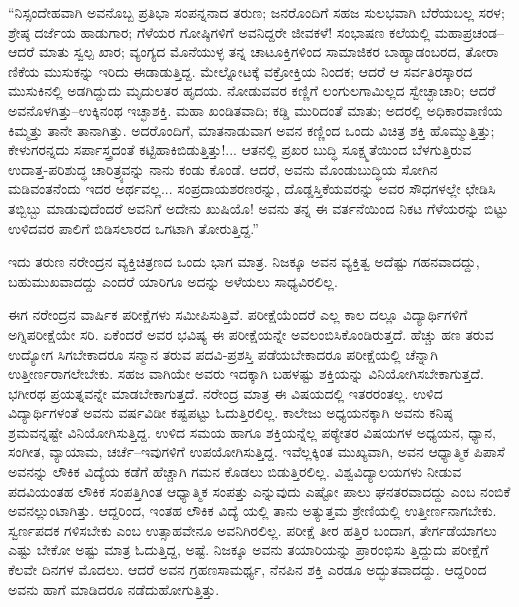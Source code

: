 “ನಿಸ್ಸಂದೇಹವಾಗಿ ಅವನೊಬ್ಬ ಪ್ರತಿಭಾ ಸಂಪನ್ನನಾದ ತರುಣ; ಜನರೊಂದಿಗೆ ಸಹಜ ಸುಲಭವಾಗಿ ಬೆರೆಯಬಲ್ಲ ಸರಳ; ಶ್ರೇಷ್ಠ ದರ್ಜೆಯ ಹಾಡುಗಾರ; ಗೆಳೆಯರ ಗೋಷ್ಠಿಗಳಿಗೆ ಅವನಿದ್ದರೇ ಜೀವಕಳೆ! ಸಂಭಾಷಣ ಕಲೆಯಲ್ಲಿ ಮಹಾಪ್ರಚಂಡ–ಆದರೆ ಮಾತು ಸ್ವಲ್ಪ ಖಾರ; ವ್ಯಂಗ್ಯದ ಮೊನೆಯುಳ್ಳ ತನ್ನ ಚಾಟೂಕ್ತಿಗಳಿಂದ ಸಾಮಾಜಿಕರ ಬಾಹ್ಯಾಡಂಬರದ, ತೋರಾ ಣಿಕೆಯ ಮುಸುಕನ್ನು ಇರಿದು ಈಡಾಡುತ್ತಿದ್ದ. ಮೇಲ್ನೋಟಕ್ಕೆ ವಕ್ರೋಕ್ತಿಯ ನಿಂದಕ; ಆದರೆ ಆ ಸರ್ವತಿರಸ್ಕಾರದ ಮುಸುಕಿನಲ್ಲಿ ಅಡಗಿದ್ದುದು ಮೃದುಲತರ ಹೃದಯ. ನೋಡುವವರ ಕಣ್ಣಿಗೆ ಲಂಗುಲಗಾಮಿಲ್ಲದ ಸ್ವೇಚ್ಛಾಚಾರಿ; ಆದರೆ ಅವನೊಳಗಿತ್ತು–ಉಕ್ಕಿನಂಥ ಇಚ್ಛಾಶಕ್ತಿ. ಮಹಾ ಖಂಡಿತವಾದಿ; ಕಡ್ಡಿ ಮುರಿದಂತೆ ಮಾತು; ಅದರಲ್ಲಿ ಅಧಿಕಾರವಾಣಿಯ ಕಿಮ್ಮತ್ತು ತಾನೇ ತಾನಾಗಿತ್ತು. ಅದರೊಂದಿಗೆ, ಮಾತನಾಡುವಾಗ ಅವನ ಕಣ್ಣಿಂದ ಒಂದು ವಿಚಿತ್ರ ಶಕ್ತಿ ಹೊಮ್ಮುತ್ತಿತ್ತು; ಕೇಳುಗರನ್ನದು ಸರ್ಪಾಸ್ತ್ರದಂತೆ ಕಟ್ಟಿಹಾಕಿಬಿಡುತ್ತಿತ್ತು!... ಆತನಲ್ಲಿ ಪ್ರಖರ ಬುದ್ಧಿ ಸೂಕ್ಷ್ಮತೆಯಿಂದ ಬೆಳಗುತ್ತಿರುವ ಉದಾತ್ತ-ಪರಿಶುದ್ಧ ಚಾರಿತ್ರ್ಯವನ್ನು ನಾನು ಕಂಡು ಕೊಂಡೆ. ಆದರೆ, ಅವನು ಮೊಂಡುಬುದ್ಧಿಯ ಸೋಗಿನ ಮಡಿವಂತನೆಂದು ಇದರ ಅರ್ಥವಲ್ಲ... ಸಂಪ್ರದಾಯಶರಣರನ್ನು, ದೊಡ್ಡಸ್ತಿಕೆಯವರನ್ನು ಅವರ ಸೌಧಗಳಲ್ಲೇ ಛೇಡಿಸಿ ತಬ್ಬಿಬ್ಬು ಮಾಡುವುದೆಂದರೆ ಅವನಿಗೆ ಅದೇನು ಖುಷಿಯೊ! ಅವನು ತನ್ನ ಈ ವರ್ತನೆಯಿಂದ ನಿಕಟ ಗೆಳೆಯರನ್ನು ಬಿಟ್ಟು ಉಳಿದವರ ಪಾಲಿಗೆ ಬಿಡಿಸಲಾರದ ಒಗಟಾಗಿ ತೋರುತ್ತಿದ್ದ.”

ಇದು ತರುಣ ನರೇಂದ್ರನ ವ್ಯಕ್ತಿಚಿತ್ರಣದ ಒಂದು ಭಾಗ ಮಾತ್ರ. ನಿಜಕ್ಕೂ ಅವನ ವ್ಯಕ್ತಿತ್ವ ಅದೆಷ್ಟು ಗಹನವಾದದ್ದು, ಬಹುಮುಖವಾದದ್ದು ಎಂದರೆ ಯಾರಿಗೂ ಅದನ್ನು ಅಳೆಯಲು ಸಾಧ್ಯವಿರಲಿಲ್ಲ.

ಈಗ ನರೇಂದ್ರನ ವಾರ್ಷಿಕ ಪರೀಕ್ಷೆಗಳು ಸಮೀಪಿಸುತ್ತಿವೆ. ಪರೀಕ್ಷೆಯೆಂದರೆ ಎಲ್ಲ ಕಾಲ ದಲ್ಲೂ ವಿದ್ಯಾರ್ಥಿಗಳಿಗೆ ಅಗ್ನಿಪರೀಕ್ಷೆಯೇ ಸರಿ. ಏಕೆಂದರೆ ಅವರ ಭವಿಷ್ಯ ಈ ಪರೀಕ್ಷೆಯನ್ನೇ ಅವಲಂಬಿಸಿಕೊಂಡಿರುತ್ತದೆ. ಹೆಚ್ಚು ಹಣ ತರುವ ಉದ್ಯೋಗ ಸಿಗಬೇಕಾದರೂ ಸನ್ಮಾನ ತರುವ ಪದವಿ-ಪ್ರಶಸ್ತಿ ಪಡೆಯಬೇಕಾದರೂ ಪರೀಕ್ಷೆಯಲ್ಲಿ ಚೆನ್ನಾಗಿ ಉತ್ತೀರ್ಣರಾಗಲೇಬೇಕು. ಸಹಜ ವಾಗಿಯೇ ಅವರು ಇದಕ್ಕಾಗಿ ಬಹಳಷ್ಟು ಶಕ್ತಿಯನ್ನು ವಿನಿಯೋಗಿಸಬೇಕಾಗುತ್ತದೆ. ಭಗೀರಥ ಪ್ರಯತ್ನವನ್ನೇ ಮಾಡಬೇಕಾಗುತ್ತದೆ. ನರೇಂದ್ರ ಮಾತ್ರ ಈ ವಿಷಯದಲ್ಲಿ ಇತರರಂತಲ್ಲ. ಉಳಿದ ವಿದ್ಯಾರ್ಥಿಗಳಂತೆ ಅವನು ವರ್ಷವಿಡೀ ಕಷ್ಟಪಟ್ಟು ಓದುತ್ತಿರಲಿಲ್ಲ. ಕಾಲೇಜು ಅಧ್ಯಯನಕ್ಕಾಗಿ ಅವನು ಕನಿಷ್ಠ ಶ್ರಮವನ್ನಷ್ಟೇ ವಿನಿಯೋಗಿಸುತ್ತಿದ್ದ. ಉಳಿದ ಸಮಯ ಹಾಗೂ ಶಕ್ತಿಯನ್ನೆಲ್ಲ ಪಠ್ಯೇತರ ವಿಷಯಗಳ ಅಧ್ಯಯನ, ಧ್ಯಾನ, ಸಂಗೀತ, ವ್ಯಾಯಾಮ, ಚರ್ಚೆ–ಇವುಗಳಿಗೆ ಉಪಯೋಗಿಸುತ್ತಿದ್ದ. ಇವೆಲ್ಲಕ್ಕಿಂತ ಮುಖ್ಯವಾಗಿ, ಅವನ ಆಧ್ಯಾತ್ಮಿಕ ಪಿಪಾಸೆ ಅವನನ್ನು ಲೌಕಿಕ ವಿದ್ಯೆಯ ಕಡೆಗೆ ಹೆಚ್ಚಾಗಿ ಗಮನ ಕೊಡಲು ಬಿಡುತ್ತಿರಲಿಲ್ಲ. ವಿಶ್ವವಿದ್ಯಾಲಯಗಳು ನೀಡುವ ಪದವಿಯಂತಹ ಲೌಕಿಕ ಸಂಪತ್ತಿಗಿಂತ ಆಧ್ಯಾತ್ಮಿಕ ಸಂಪತ್ತು ಎನ್ನುವುದು ಎಷ್ಟೋ ಪಾಲು ಘನತರವಾದದ್ದು ಎಂಬ ನಂಬಿಕೆ ಅವನಲ್ಲುಂಟಾಗಿತ್ತು. ಆದ್ದರಿಂದ, ಇಂತಹ ಲೌಕಿಕ ವಿದ್ಯೆ ಯಲ್ಲಿ ತಾನು ಅತ್ಯುತ್ತಮ ಶ್ರೇಣಿಯಲ್ಲಿ ಉತ್ತೀರ್ಣನಾಗಬೇಕು. ಸ್ವರ್ಣಪದಕ ಗಳಿಸಬೇಕು ಎಂಬ ಉತ್ಸಾಹವೇನೂ ಅವನಿಗಿರಲಿಲ್ಲ. ಪರೀಕ್ಷೆ ತೀರ ಹತ್ತಿರ ಬಂದಾಗ, ತೇರ್ಗಡೆಯಾಗಲು ಎಷ್ಟು ಬೇಕೋ ಅಷ್ಟು ಮಾತ್ರ ಓದುತ್ತಿದ್ದ, ಅಷ್ಟೆ. ನಿಜಕ್ಕೂ ಅವನು ತಯಾರಿಯನ್ನು ಪ್ರಾರಂಭಿಸು ತ್ತಿದ್ದುದು ಪರೀಕ್ಷೆಗೆ ಕೆಲವೇ ದಿನಗಳ ಮೊದಲು. ಆದರೆ ಅವನ ಗ್ರಹಣಸಾಮರ್ಥ್ಯ, ನೆನಪಿನ ಶಕ್ತಿ ಎರಡೂ ಅದ್ಭುತವಾದದ್ದು. ಆದ್ದರಿಂದ ಅವನು ಹಾಗೆ ಮಾಡಿದರೂ ನಡೆದುಹೋಗುತ್ತಿತ್ತು.

